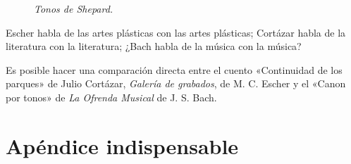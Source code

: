 \begin{figure}[H]
\begin{center}
\end{center}
\caption{\emph{Tonos de Shepard.}}
\label{ceb:shepard}
\end{figure}

Escher habla de las artes plásticas con las artes plásticas; Cortázar habla de la literatura con la literatura; ¿Bach habla de la música con la música?

Es posible hacer una comparación directa entre el cuento «Continuidad de los parques» de Julio Cortázar, \emph{Galería de grabados}, de M. C. Escher y el «Canon por tonos» de \emph{La Ofrenda Musical} de J. S. Bach.

\newpage
\section {Apéndice indispensable}
